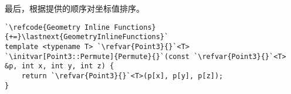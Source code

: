 最后，根据提供的顺序对坐标值排序。
\begin{lstlisting}
`\refcode{Geometry Inline Functions}{+=}\lastnext{GeometryInlineFunctions}`
template <typename T> `\refvar{Point3}{}`<T>
`\initvar[Point3::Permute]{Permute}{}`(const `\refvar{Point3}{}`<T> &p, int x, int y, int z) {
    return `\refvar{Point3}{}`<T>(p[x], p[y], p[z]);
}
\end{lstlisting}
